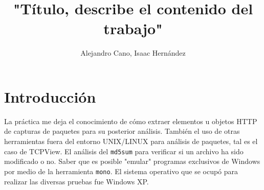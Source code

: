 \documentclass[12pt,twocolumn]{report}
\title{"Título, describe el contenido del trabajo"}
\author{Alejandro Cano,   Isaac Hernández}  %
\affil{Universidad Nacional Autónoma de México}
\date{ }%
\begin{document}
\ifpdf
{}
\else
{}
\fi

\maketitle


\begin{abstract}
\end{abstract}
\section{Introducción}

La práctica me deja el conocimiento de cómo extraer elementos u objetos HTTP de capturas de paquetes para su posterior análisis.
También el uso de otras herramientas fuera del entorno UNIX/LINUX para análisis de paquetes, tal es el caso de TCPView. El análisis
del \texttt{md5sum} para verificar si un archivo ha sido modificado o no. Saber que es posible "emular" programas exclusivos de Windows
por medio de la herramienta \texttt{mono}.
El sistema operativo que se ocupó para realizar las diversas pruebas fue Windows XP.



\end{document}
